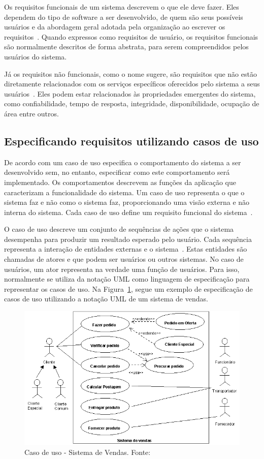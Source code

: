 Os requisitos funcionais de um sistema descrevem o que ele deve fazer.
Eles dependem do tipo de software a ser desenvolvido, de quem são seus possíveis usuários e da abordagem geral adotada pela organização ao escrever os requisitos~\cite{Sommerville}.
Quando expressos como requisitos de usuário, os requisitos funcionais são normalmente descritos de forma abstrata, para serem compreendidos pelos usuários do sistema.\label{texto:requisito_funcional}

Já os requisitos não funcionais, como o nome sugere, são requisitos que não estão diretamente relacionados com os serviços específicos oferecidos pelo sistema a seus usuários~\cite{Sommerville}.
Eles podem estar relacionados às propriedades emergentes do sistema, como confiabilidade, tempo de resposta, integridade, disponibilidade, ocupação de área entre outros.\label{texto:requisito_nao_funcional}

\subsection{Especificando requisitos utilizando casos de uso}

De acordo com  um caso de uso especifica o comportamento do sistema a ser desenvolvido sem, no entanto, especificar como este comportamento será implementado.
Os comportamentos descrevem as funções da aplicação que caracterizam a funcionalidade do sistema.
Um caso de uso representa o que o sistema faz e não como o sistema faz, proporcionando uma visão externa e não interna do sistema. Cada caso de uso define um requisito funcional do sistema~\cite{ReqJair}.

O caso de uso descreve um conjunto de sequências de ações que o sistema desempenha para produzir um resultado esperado pelo usuário.
Cada sequência representa a interação de entidades externas e o sistema~\cite{ReqJair}.
Estas entidades são chamadas de atores e que podem ser usuários ou outros sistemas.
No caso de usuários, um ator representa na verdade uma função de usuários. Para isso, normalmente se utiliza da notação UML como linguagem de especificação para representar os casos de uso. Na Figura~\ref{cap:02:fig:caso-de-uso-exemplo}, segue um exemplo de especificação de casos de uso utilizando a notação UML de um sistema de vendas.\label{texto:especificando-com-casos-de-uso}

\begin{figure}
\centering
\includegraphics[width=0.7\linewidth]{src/imagens/casosd2.png}
\caption{Caso de uso - Sistema de Vendas. Fonte:~\cite{ReqJair2}}
\label{cap:02:fig:caso-de-uso-exemplo}
\end{figure}

